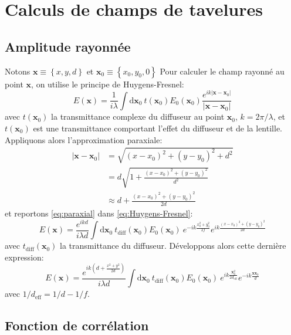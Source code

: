 \chapter{Calculs de champs de tavelures}
\section{Amplitude rayonnée}
Notons $\mathbf{x} \equiv \left\lbrace x,y,d \right\rbrace$ et $\mathbf{x}_0 \equiv \left\lbrace x_0,y_0,0 \right\rbrace$
Pour calculer le champ rayonné au point $\mathbf{x}$, on utilise le principe de Huygens-Fresnel:
\begin{equation}
E(\mathbf{x})=\frac{1}{i \lambda} \int {\mathrm{d}\mathbf{x}_0 \: t(\mathbf{x}_0) E_0(\mathbf{x}_0) \frac{e^{ik \left| \mathbf{x}-\mathbf{x}_0 \right| }}{\left| \mathbf{x} - \mathbf{x}_0 \right| }}
\label{eq:Huygens-Fresnel}
\end{equation}
avec $t(\mathbf{x}_0)$ la transmittance complexe du diffuseur au point $\mathbf{x}_0$, $k=2\pi /\lambda$, et $t(\mathbf{x}_0)$ est une transmittance comportant l'effet du diffuseur et de la lentille.
Appliquons alors l'approximation paraxiale:
\begin{align}
\nonumber \left| \mathbf{x} - \mathbf{x}_0 \right| &= \sqrt{(x-x_0)^2+(y-y_0)^2+d^2} \\
\nonumber & = d \sqrt{1+\frac{(x-x_0)^2+(y-y_0)^2}{d^2}} \\
& \approx d+ \frac{(x-x_0)^2+(y-y_0)^2}{2d}
\label{eq:paraxial}
\end{align}
et reportons \ref{eq:paraxial} dans \ref{eq:Huygens-Fresnel}:
\begin{equation}
E(\mathbf{x})=\frac{e^{ikd}}{i \lambda d} \int{\mathrm{d} \mathbf{x}_0 \: t_{\mathrm{diff}}(\mathbf{x}_0) E_0(\mathbf{x}_0) \: e^{-ik \frac{x_0^2+y_0^2}{2f}} e^{ik \frac{(x-x_0)^2+(y-y_0)^2}{2d}}}
\end{equation}
avec $t_{\mathrm{diff}}(\mathbf{x}_0)$ la transmittance du diffuseur. Développons alors cette dernière expression:
\begin{equation}
E(\mathbf{x})=\frac{e^{i k \left( d + \frac{x^2 + y^2}{2 d}\right) }}{i \lambda d} \int{\mathrm{d} \mathbf{x}_0 \: t_{\mathrm{diff}}(\mathbf{x}_0) E_0(\mathbf{x}_0) \: e^{ik \frac{\mathbf{x}_0^2}{2 d_{\mathrm{eff}}}} e^{-ik\frac{\mathbf{x} \mathbf{x}_0}{d}}}
\end{equation}
avec $1/d_{\mathrm{eff}}=1/d-1/f$.

\section{Fonction de corrélation}
